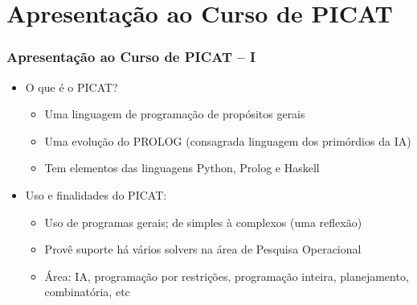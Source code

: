 \section{Apresentação ao Curso de PICAT}



\begin{frame}[fragile]

  \frametitle{Apresentação ao Curso de PICAT -- I}
  \begin{itemize}
    \item O que é o PICAT?
    \pause
       \begin{itemize}
			\item Uma linguagem de programação de propósitos gerais
			\item Uma evolução do PROLOG (consagrada linguagem dos primórdios da IA)
			\item Tem elementos das linguagens Python, Prolog e Haskell
		\end{itemize}

    \item Uso e finalidades do PICAT:
    \pause
       \begin{itemize}
			\item Uso de programas gerais; de simples à complexos (uma reflexão)
			\item Provê suporte há vários solvers na área de Pesquisa Operacional
			\item Área: IA, programação por restrições, programação inteira, planejamento,
			combinatória, etc
		\end{itemize}

   \end{itemize}

  \end{frame}
    
